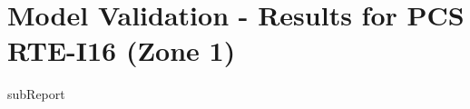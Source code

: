 




    \section{Model Validation - Results for PCS RTE-I16 (Zone 1)}

    {{subReport}}
    \newpage

